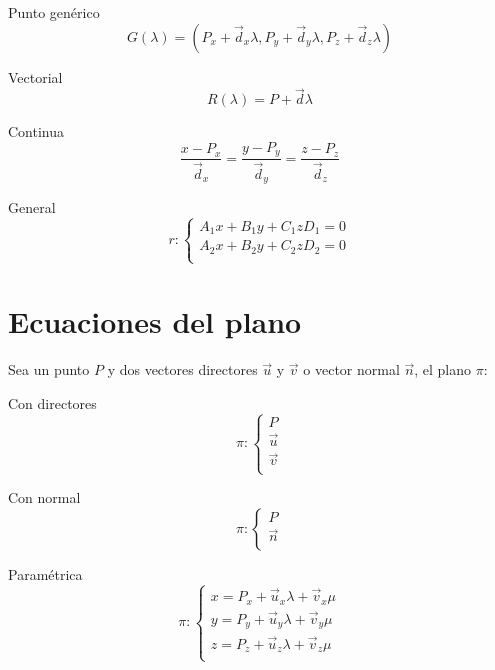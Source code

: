 \documentclass[12pt, letterpaper, twoside]{article}
\begin{document}
	Punto genérico
	\begin{equation}
		G(\lambda) = (P_x + \vec{d}_x \lambda, P_y + \vec{d}_y \lambda, P_z + \vec{d}_z \lambda)
	\end{equation}
	
	Vectorial
	\begin{equation}
		R(\lambda) = P + \vec{d} \lambda
	\end{equation}

	Continua
	\begin{equation}
		\frac{x - P_x}{\vec{d}_x} = \frac{y - P_y}{\vec{d}_y} = \frac{z - P_z}{\vec{d}_z}
	\end{equation}

	General
	\begin{equation}
		r :
		\begin{cases}
			A_1x + B_1y + C_1z  D_1 = 0 \\
			A_2x + B_2y + C_2z  D_2 = 0 \\
		\end{cases}
	\end{equation}


	\section{Ecuaciones del plano}
	
	Sea un punto $P$ y dos vectores directores $\vec{u}$ y $\vec{v}$ o vector normal $\vec{n}$, el plano $\pi$:
	
	Con directores
	\begin{equation}
		\pi : \begin{cases}
			P \\
			\vec{u} \\
			\vec{v} \\
		\end{cases}
	\end{equation}

	Con normal
	\begin{equation}
		\pi : \begin{cases}
			P \\
			\vec{n} \\
		\end{cases}
	\end{equation}

	Paramétrica
	\begin{equation}
		\pi :
		\begin{cases}
			x = P_x + \vec{u}_x \lambda + \vec{v}_x \mu \\
			y = P_y + \vec{u}_y \lambda + \vec{v}_y \mu \\
			z = P_z + \vec{u}_z \lambda + \vec{v}_z \mu \\
		\end{cases}
	\end{equation}
	
\end{document}
